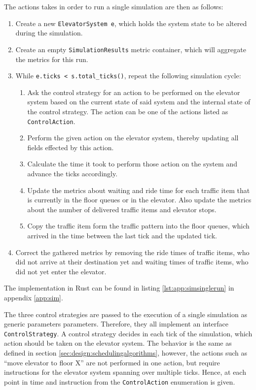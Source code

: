 The actions takes in order to run a single simulation are then as follows:
\begin{enumerate}
    \item Create a new \texttt{ElevatorSystem e}, which holds the system state to be altered during the simulation.
    \item Create an empty \texttt{SimulationResults} metric container, which will aggregate the metrics for this run.
    \item While \texttt{e.ticks < s.total\_ticks()}, repeat the following simulation cycle:
    \begin{enumerate}
        \item Ask the control strategy for an action to be performed on the elevator system based on the current state of said system and the internal state of the control strategy.
        The action can be one of the actions listed as \texttt{ControlAction}.
        \item Perform the given action on the elevator system, thereby updating all fields effected by this action.
        \item Calculate the time it took to perform those action on the system and advance the ticks accordingly.
        \item Update the  metrics about waiting and ride time for each traffic item that is currently in the floor queues or in the elevator. Also update the metrics about the number of delivered traffic items and elevator stops.
        \item Copy the traffic item form the traffic pattern into the floor queues, which arrived in the time between the last tick and the updated tick.
    \end{enumerate}
    \item Correct the gathered metrics by removing the ride times of traffic items, who did not arrive at their destination yet and waiting times of traffic items, who did not yet enter the elevator.
\end{enumerate}
The implementation in Rust can be found in listing \ref{lst:app:simsinglerun} in appendix \ref{app:sim}.

The three control strategies are passed to the execution of a single simulation as generic parameters parameters.
Therefore, they all implement an interface \texttt{ControlStrategy}.
A control strategy decides in each tick of the simulation, which action should be taken on the elevator system.
The behavior is the same as defined in section \ref{sec:design:schedulingalgorithms}, however, the actions such as \enquote{move elevator to floor X} are not performed in one action, but require instructions for the elevator system spanning over multiple ticks.
Hence, at each point in time and instruction from the \texttt{ControlAction} enumeration is given.

